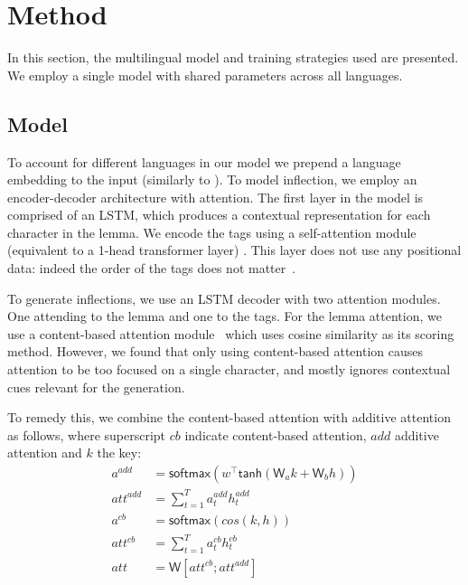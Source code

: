 \documentclass[11pt,a4paper]{article}
\newcommand\jp[1]{\textbf{JP: #1}}
\begin{document}


\section{Method}

In this section, the multilingual model and training strategies used
are presented. We employ a single model with shared parameters
across all languages. 

\subsection{Model}
To account for different languages in our model we prepend a language
embedding to the input (similarly to ).  To model inflection, we employ an
encoder-decoder architecture with attention. The first layer in the
model is comprised of an LSTM, which produces a contextual
representation for each character in the lemma.  We encode the tags
using a self-attention module (equivalent to a 1-head transformer
layer) \cite{DBLP:conf/nips/VaswaniSPUJGKP17}.  This layer does not
use any positional data: indeed the order of the tags does not
matter~\cite{DBLP:conf/emnlp/AnastasopoulosN19}.

To generate inflections, we use an LSTM decoder with two attention
modules. One attending to the lemma and one to the tags. For the lemma
attention, we use a content-based attention
module~\cite{graves2014neural, karunaratne2021robust} which uses
cosine similarity as its scoring method.  However, we found that only
using content-based attention causes attention to be too focused on a
single character, and mostly ignores contextual cues relevant for the
generation.

To remedy this, we combine the content-based attention with additive
attention as follows, where superscript $cb$ indicate content-based attention,
$add$ additive attention and $k$ the key:
%
\begin{align*}
	a^{add} & = \mathsf{softmax}(w^\top\mathsf{tanh}(\mathsf{W}_ak + \mathsf{W}_bh))\\
	att^{add} & = \sum_{t=1}^{T}a_t^{add}h_t^{add}\\
	a^{cb} & = \mathsf{softmax}(cos(k,h))\\
	att^{cb} & = \sum_{t=1}^{T}a_t^{cb}h_t^{cb}\\
	att & = \mathsf{W}[att^{cb}; att^{add}]
\end{align*}
\end{document}
